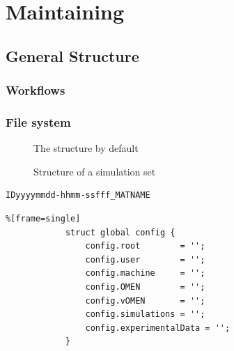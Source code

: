 	
			 
	
	\section{Maintaining \software}
		\subsection{General Structure} \label{sec:SoftwareStructure}
			\subsubsection{Workflows}
			
			\subsubsection{File system}
		
			\begin{figure}[htbp]
				\begin{minipage}[b]{0.59\textwidth}
				\caption{The \software structure by default}
				\label{dir:ToolboxTree}
			\end{minipage}
			\hfill
			\begin{minipage}[b]{0.39\textwidth}
			\caption{Structure of a simulation set}
			\label{dir:SimSetTree}
			\end{minipage}
			\end{figure}
			
			\begin{lstlisting}[frame=single]
				IDyyyymmdd-hhmm-ssfff_MATNAME
			\end{lstlisting}
				
			\begin{lstlisting}%[frame=single]
			struct global config {
				config.root        = '';
				config.user        = '';
				config.machine     = '';
				config.OMEN        = '';
				config.vOMEN       = '';
				config.simulations = '';
				config.experimentalData = '';
			}
			\end{lstlisting}
			
